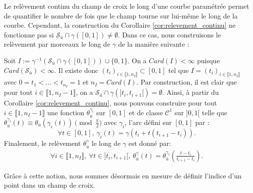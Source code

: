 Le relèvement continu du champ de croix le long d'une courbe paramétrée permet de quantifier le nombre de fois que le champ tourne sur lui-même le long de la courbe. Cependant, la construction du Corollaire \ref{cor:relevement_continu} ne fonctionne pas si $\mathcal{S}_{\bar{u}}\cap\gamma([0,1])\neq\emptyset$. Dans ce cas, nous construisons le relèvement par morceaux le long de $\gamma$ de la manière suivante :

Soit $I:=\gamma^{-1}(\mathcal{S}_{\bar{u}}\cap\gamma([0, 1]))\cup\{0, 1\}$. On a $Card(I)<\infty$ puisque $Card(\mathcal{S}_{\bar{u}})<\infty$. Il existe donc $(t_i)_{i\in\llbracket 1, n_I\rrbracket}\subset[0,1]$ tel que $I=(t_i)_{i\in\llbracket 1, n_I\rrbracket}$ avec $0=t_1<\dots<t_{n_I}=1$ et $n_I=Card(I)$. Par construction, il est clair que pour tout $i\in\llbracket 1, n_I-1 \rrbracket$, on a $\mathcal{S}_{\bar{u}}\cap\gamma(]t_i, t_{i+1}[)=\emptyset$. Ainsi, à partir du Corollaire \ref{cor:relevement_continu}, nous pouvons construire pour tout $i\in\llbracket 1, n_I-1\rrbracket$ une fonction $\theta^{\gamma_i}_{\bar{u}}$ sur $[0,1]$ et de classe $\mathcal{C}^1$ sur $]0,1[$ telle que $\theta_{\bar{u}}^{\gamma_i}(t)\equiv\theta_{\bar{u}}(\gamma_i(t))\pmod{\frac{\pi}{2}}$ avec $\gamma_i$, l'arc défini sur $[0, 1]$ par :
$$
\forall t\in[0, 1],~\gamma_i(t)=\gamma(t_i+t(t_{i+1}-t_i)).
$$
Finalement, le relèvement $\theta_{\bar{u}}^\gamma$ le long de $\gamma$ est donné par:
\begin{eqnarray*}
    \forall i\in\llbracket 1, n_I\rrbracket,~\forall t\in]t_i, t_{i+1}[,~\theta_{\bar{u}}^\gamma(t)=\theta_{\bar{u}}^{\gamma_i}\left(\frac{t-t_i}{t_{i+1}-t_i}\right).
\end{eqnarray*}



Grâce à cette notion, nous sommes désormais en mesure de définir l'indice d'un point dans un champ de croix.



